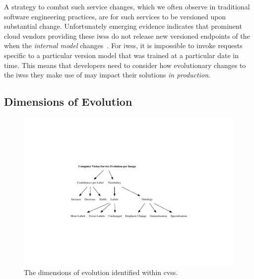 A strategy to combat such service changes, which we often observe in traditional software engineering practices, are for such services to be versioned upon substantial change. Unfortunately emerging evidence indicates that prominent cloud vendors providing these \glspl{iws} do not release new versioned endpoints of the  when the \textit{internal model} changes~\citep{Cummaudo:2019icsme}. For \glspl{iws}, it is impossible to invoke requests specific to a particular version model that was trained at a particular date in time.  This means that developers need to consider how evolutionary changes to the \glspl{iws} they make use of may impact their solutions \textit{in production}. 


\subsection{Dimensions of Evolution}


\begin{figure}
    \centering
    \includegraphics[width=\linewidth]{service-evolution}
    \caption{The dimensions of evolution identified within \glspl{cvs}.}
    \label{fig:service-evolution}
\end{figure}

